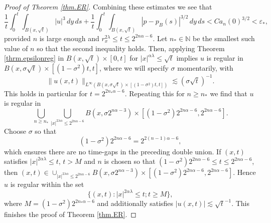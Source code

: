 \documentclass[11pt]{article}
\numberwithin{equation}{section}
\theoremstyle{remark}
\theoremstyle{definition}
\newcommand{\N}{\mathbb{N}}
\newcommand{\si}{\sigma}
\newcommand\al{\alpha}
\newcommand\e {\varepsilon}  %
\newcommand\la{\lambda}
\newcommand{\I}{\infty}
\begin{document}
\begin{proof}[Proof of Theorem \ref{thm.ER}]
Combining these estimates we see that
\[
	\frac 1 {t} \int_0^{t} \int_{B(x,\sqrt t)} |u|^3\,dy\,ds	
 + \frac 1 {t}\int_0^{t}\int_{B(x,\sqrt t)} |p -p_B(s)|^{3/2}\,dy\,ds < C a_n(0)^{3/2}
< \e_*,
\]
provided   $n$ is large enough and $r_x^{2\la}\leq t\leq 2^{2n\al -6}$. Let $n_*\in \N$ be the smallest such value of $n$ so that the second inequality holds.
%
%
%
%
Then, applying Theorem \ref{thrm.epsilonreg}  in $B(x,\sqrt t) \times [0, t]$ for $ |x|^{\al \la} \leq \sqrt t$ implies $u$ is regular in
$B(x,\si \sqrt t )\times [ (1-\si^2)t   , t]$, where we will specify $\si$ momentarily{, with
\[ \|u(x,t)\|_{L^\I (B(x,\si \sqrt t )\times [ (1-\si^2)t   , t])} \lesssim (\si \sqrt t)^{-1}.\]
} 
This holds in particular for $t = 2^{2n_*\al -6}$.
Repeating this for $n\geq n_*$ we find that $u$ is regular in%
\[
\bigcup_{n\geq n_* }  \bigcup_{|x|^{2\la\al}\leq  2^{2n\al -6 }} B(x,\si 2^{n \al  - 3} )\times [(1-\si^2) 2^{2n\al-6}, 2^{2n\al-6}].
\]
Choose $\si$ so that%
\[
(1-\si^2)2^{2n\al  -6}= 2^{2(n-1)\al-6},
\]
which ensures there are no time-gaps in the preceding double union. 
If $(x,t)$ satisfies $|x|^{2\al\la}\leq  t$, $t>M$ and $n$ is chosen so that
$(1-\si^2)2^{2n\al  -6} \leq t \leq 2^{2n\al-6}$, then $(x,t) \in \cup_{|x|^{2\la\al}\leq  2^{2n\al -6}}  B(x,\si 2^{n \al  - 3} )\times [(1-\si^2) 2^{2n\al-6}, 2^{2n\al-6}]$. Hence $u$ is regular within the set
\[
\{ (x,t): |x|^{2\al\la} \leq t; t\geq M\},
\]
where  $M= (1-\si^2)2^{2n_*\al-6}$ { and additionally satisfies $|u(x,t)|\lesssim \sqrt t^{-1}$}. This finishes the proof of Theorem  \ref{thm.ER}. 
\end{proof}
\end{document}
